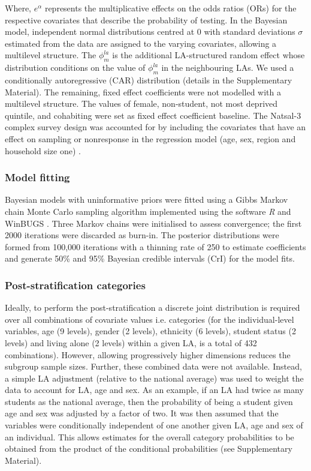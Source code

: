\documentclass[fleqn,10pt]{wlscirep}
\begin{document}
Where, $e^{\alpha}$ represents the multiplicative effects on the odds ratios (ORs) for the respective covariates that describe the probability of testing. In the Bayesian model, independent normal distributions centred at 0 with standard deviations $\sigma$ estimated from the data are assigned to the varying covariates, allowing a multilevel structure. The $\phi_m^{la}$ is the additional LA-structured random effect whose distribution conditions on the value of $\phi_m^{la}$ in the neighbouring LAs. We used a conditionally autoregressive (CAR) distribution (details in the Supplementary Material). The remaining, fixed effect coefficients were not modelled with a multilevel structure. The values of female, non-student, not most deprived quintile, and cohabiting were set as fixed effect coefficient baseline.
The Natsal-3 complex survey design was accounted for by including the covariates that have an effect on sampling or nonresponse in the regression model (age, sex, region and household size one) \cite{Gelman2007b}.

\subsubsection*{Model fitting}
Bayesian models with uninformative priors were fitted using a Gibbs Markov chain Monte Carlo sampling algorithm implemented using the software {\it R} \cite{RCoreTeam2017} and WinBUGS \cite{Lunn2000}. Three Markov chains were initialised to assess convergence; the first 2000 iterations were discarded as burn-in. The posterior distributions were formed from 100,000 iterations with a thinning rate of 250 to estimate coefficients and generate 50\% and 95\% Bayesian credible intervals (CrI) for the model fits.

\subsubsection*{Post-stratification categories}
Ideally, to perform the post-stratification a discrete joint distribution is required over all combinations of covariate values i.e. categories (for the individual-level variables, age (9 levels), gender (2 levels), ethnicity (6 levels), student status (2 levels) and living alone (2 levels) within a given LA, is a total of 432 combinations). However, allowing progressively higher dimensions reduces the subgroup sample sizes. Further, these combined data were not available. Instead, a simple LA adjustment (relative to the national average) was used to weight the data to account for LA, age and sex. As an example, if an LA had twice as many students as the national average, then the probability of being a student given age and sex was adjusted by a factor of two.
It was then assumed that the variables were conditionally independent of one another given LA, age and sex of an individual. This allows estimates for the overall category probabilities to be obtained from the product of the conditional probabilities (see Supplementary Material). 
\end{document}
